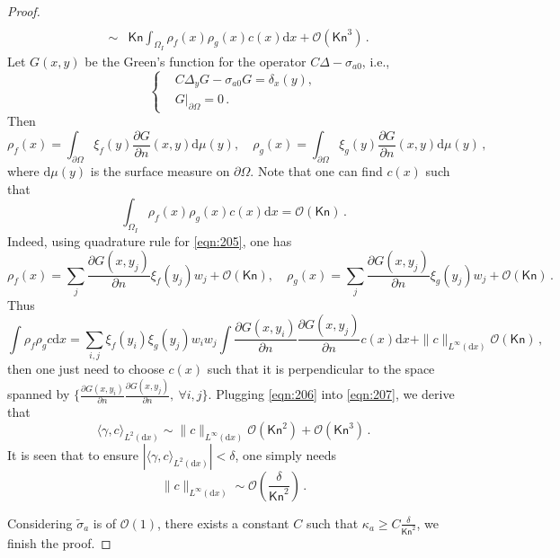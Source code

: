 \documentclass[english,reqno]{amsart}
\theoremstyle{plain}
\theoremstyle{definition} %
\newcommand{\rd}{\mathrm{d}}
\newcommand{\Kn}{\mathsf{Kn}}
\begin{document}
\begin{proof}
\begin{eqnarray}
\\ &\sim&  \Kn \int_{\Omega_I}\rho_f(x)\rho_g(x) c(x)\rd{x}+\mathcal{O}(\Kn^3) \,. \label{eqn:207}
\end{eqnarray}
Let $G(x,y)$ be the Green's function for the operator $C\Delta- \sigma_{a0}$, i.e., 
\begin{equation} \label{eqn:Green}
\begin{cases}
&C \Delta_y G - \sigma_{a0} G = \delta_x(y), 
\\
&G|_{\partial \Omega} = 0\,.
\end{cases}
\end{equation}
Then
\begin{equation} \label{eqn:205}
\rho_f(x) =  \int_{\partial \Omega} \xi_f(y) \frac{\partial G}{\partial n} (x,y) \rd \mu(y),
\quad
\rho_g(x) =  \int_{\partial \Omega} \xi_g(y) \frac{\partial G}{\partial n}(x,y) \rd\mu(y) \,,
\end{equation}
where $\rd\mu(y)$ is the surface measure on $\partial \Omega$. Note that one can find $c(x)$ such that 
\begin{equation}\label{eqn:206}
\int_{\Omega_I} \rho_f(x) \rho_g(x) c(x) \rd{x} = \mathcal{O}(\Kn)\,.
\end{equation}
Indeed, using quadrature rule for \eqref{eqn:205}, one has
\begin{equation*}
\rho_f(x) = \sum_j \frac{\partial G(x,y_j)}{\partial n} \xi_f(y_j) w_j + \mathcal{O}(\Kn), \quad 
\rho_g(x) = \sum_j \frac{\partial G(x,y_j)}{\partial n} \xi_g(y_j) w_j + \mathcal{O}(\Kn)\,.
\end{equation*}
Thus
\begin{equation} \label{eqn:orthogonal1}
\int \rho_f \rho_g c \rd{x} = \sum_{i,j} \xi_f(y_i) \xi_g(y_j) w_i w_j \int \frac{\partial G(x,y_i)}{\partial n} \frac{\partial G(x,y_j)}{\partial n} c(x) \rd{x} +\|c\|_{L^\infty(\rd{x})} \mathcal{O}(\Kn)\,,
\end{equation}
then one just need to choose $c(x)$ such that it is perpendicular to the space spanned by $\{ \frac{\partial G(x,y_i)}{\partial n} \frac{\partial G(x,y_j)}{\partial n}, ~ \forall  i, j\}$. Plugging \eqref{eqn:206} into \eqref{eqn:207}, we derive that
\begin{equation}
\langle\gamma,c\rangle_{L^2(\rd{x})}\sim \|c\|_{L^\infty(\rd{x})} \mathcal{O}(\Kn^2)+\mathcal{O}(\Kn^3)\,.
\end{equation} 
It is seen that to ensure $|\langle\gamma,c\rangle_{L^2(\rd{x})}|<\delta$, one simply needs
\begin{equation*}
\|c\|_{L^\infty(\rd{x})} \sim\mathcal{O}\left(\frac{\delta}{\Kn^2}\right)\,.
\end{equation*}

Considering $\tilde{\sigma}_a$ is of $\mathcal{O}(1)$, there exists a constant $C$ such that $\kappa_a\geq C\frac{\delta}{\Kn^2}$, we finish the proof.

\end{proof}
\end{document}

